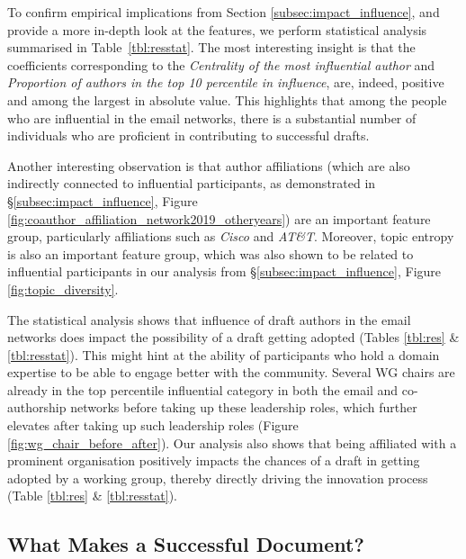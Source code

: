 \documentclass[twocolumn,10pt]{article}
\newcommand{\pb}[1]{\vspace{0.75ex}\noindent{\textbf{#1}}}
\begin{document}
\pb{Predicting Adoption:}
To confirm empirical implications from Section \ref{subsec:impact_influence},
and provide a more in-depth look at the features, we perform statistical
analysis summarised in Table~\ref{tbl:resstat}. The most interesting
insight is that the coefficients corresponding to the \emph{Centrality of
the most influential author} and \emph{Proportion of authors in the top 10
percentile in influence}, are, indeed, positive and among the largest in
absolute value. This highlights that among the people who are influential
in the email networks, there is a substantial number of individuals who are
proficient in contributing to successful drafts.

Another interesting observation is that author affiliations (which are
also indirectly connected to influential participants, as demonstrated in 
\S\ref{subsec:impact_influence}, Figure \ref{fig:coauthor_affiliation_network2019_otheryears})
are an important feature group, particularly affiliations such as \textit{Cisco}
and \textit{AT\&T}. Moreover, topic entropy is also an important feature
group, which was also shown to be related to influential participants in
our analysis from \S\ref{subsec:impact_influence}, Figure \ref{fig:topic_diversity}. 

\pb{Summary:}
The statistical analysis shows that influence of draft authors in the email
networks does impact the possibility of a draft getting adopted (Tables
\ref{tbl:res} \& \ref{tbl:resstat}). This might hint at the ability of
participants who hold a domain expertise to be able to engage better with
the community. Several WG chairs are already in the top percentile
influential category in both the email and co-authorship networks before
taking up these leadership roles, which further elevates after taking up
such leadership roles (Figure \ref{fig:wg_chair_before_after}).  Our
analysis also shows that being affiliated with a prominent organisation
positively impacts the chances of a draft in getting adopted by a working
group, thereby directly driving the innovation process (Table \ref{tbl:res}
\& \ref{tbl:resstat}).

\subsection{What Makes a Successful Document?}
\end{document}
